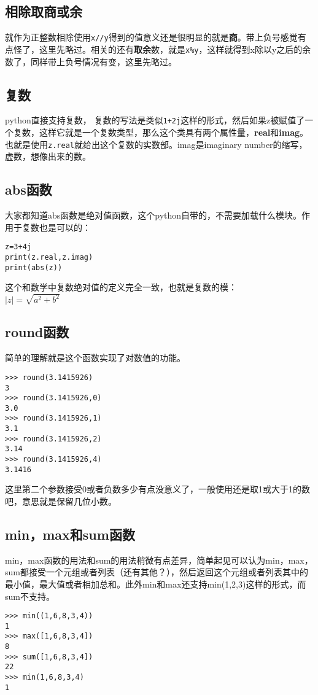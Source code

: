 \documentclass[12pt,oneside]{book}
\begin{document}
\begin{common-format}
\subsection{相除取商或余}
就作为正整数相除使用\verb+x//y+得到的值意义还是很明显的就是\textbf{商}。带上负号感觉有点怪了，这里先略过。相关的还有\textbf{取余}数，就是\verb+x%y+，这样就得到x除以y之后的余数了，同样带上负号情况有变，这里先略过。



\subsection{复数}
python直接支持复数， 复数的写法是类似\verb|1+2j|这样的形式，然后如果z被赋值了一个复数，这样它就是一个复数类型，那么这个类具有两个属性量，\textbf{real}和\textbf{imag}。也就是使用\verb+z.real+就给出这个复数的实数部。imag是imaginary number的缩写，虚数，想像出来的数。

\subsection{abs函数}
大家都知道abs函数是绝对值函数，这个python自带的，不需要加载什么模块。作用于复数也是可以的：
\begin{Verbatim}
z=3+4j
print(z.real,z.imag)
print(abs(z))
\end{Verbatim}

这个和数学中复数绝对值的定义完全一致，也就是复数的模：\\
$ \left| z \right| =\sqrt { a^{ 2 }+b^{ 2 } }  $

\subsection{round函数}
简单的理解就是这个函数实现了对数值的功能。
\begin{Verbatim}
>>> round(3.1415926)
3
>>> round(3.1415926,0)
3.0
>>> round(3.1415926,1)
3.1
>>> round(3.1415926,2)
3.14
>>> round(3.1415926,4)
3.1416
\end{Verbatim}

这里第二个参数接受0或者负数多少有点没意义了，一般使用还是取1或大于1的数吧，意思就是保留几位小数。


\subsection{min，max和sum函数}
\label{sec:sum函数}
min，max函数的用法和sum的用法稍微有点差异，简单起见可以认为min，max，sum都接受一个元组或者列表（还有其他？），然后返回这个元组或者列表其中的最小值，最大值或者相加总和。此外min和max还支持min(1,2,3)这样的形式，而sum不支持。
\begin{Verbatim}
>>> min((1,6,8,3,4))
1
>>> max([1,6,8,3,4])
8
>>> sum([1,6,8,3,4])
22
>>> min(1,6,8,3,4)
1
\end{Verbatim}




\end{common-format}
\end{document}
